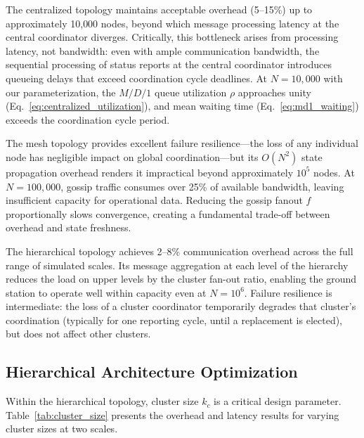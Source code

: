 \documentclass[journal]{IEEEtran}
\begin{document}
The centralized topology maintains acceptable overhead (5--15\%) up to approximately 10{,}000 nodes, beyond which message processing latency at the central coordinator diverges. Critically, this bottleneck arises from processing latency, not bandwidth: even with ample communication bandwidth, the sequential processing of status reports at the central coordinator introduces queueing delays that exceed coordination cycle deadlines. At $N = 10{,}000$ with our parameterization, the $M/D/1$ queue utilization $\rho$ approaches unity (Eq.~\ref{eq:centralized_utilization}), and mean waiting time (Eq.~\ref{eq:md1_waiting}) exceeds the coordination cycle period.


The mesh topology provides excellent failure resilience---the loss of any individual node has negligible impact on global coordination---but its $O(N^2)$ state propagation overhead renders it impractical beyond approximately $10^5$ nodes. At $N = 100{,}000$, gossip traffic consumes over 25\% of available bandwidth, leaving insufficient capacity for operational data. Reducing the gossip fanout $f$ proportionally slows convergence, creating a fundamental trade-off between overhead and state freshness.

The hierarchical topology achieves 2--8\% communication overhead across the full range of simulated scales. Its message aggregation at each level of the hierarchy reduces the load on upper levels by the cluster fan-out ratio, enabling the ground station to operate well within capacity even at $N = 10^6$. Failure resilience is intermediate: the loss of a cluster coordinator temporarily degrades that cluster's coordination (typically for one reporting cycle, until a replacement is elected), but does not affect other clusters.

\subsection{Hierarchical Architecture Optimization}

Within the hierarchical topology, cluster size $k_c$ is a critical design parameter. Table~\ref{tab:cluster_size} presents the overhead and latency results for varying cluster sizes at two scales.
\end{document}
